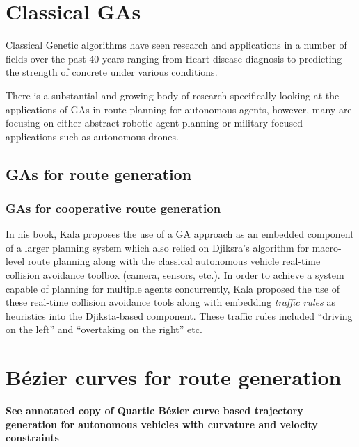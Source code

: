 
\section{Classical GAs}

Classical Genetic algorithms have seen research and applications in a number of fields over the past 40 years ranging from Heart disease diagnosis\cite{reddyHybridGeneticAlgorithm2020} to predicting the strength of concrete under various conditions\cite{shariatiPredictionConcreteStrength2020}.

There is a substantial and growing body of research specifically looking at the applications of GAs in route planning for autonomous agents, however, many are focusing on either abstract robotic agent planning or  military focused applications such as autonomous drones\cite{robergeFastGeneticAlgorithm2018}.


\subsection{GAs for route generation}


\subsubsection{GAs for cooperative route generation}

In his book, Kala \cite{kalaOptimizationBasedPlanning2016} proposes the use of a GA approach as an embedded component of a larger planning system which also relied on Djiksra's algorithm for macro-level route planning along with the classical autonomous vehicle real-time collision avoidance toolbox (camera, sensors, etc.). In order to achieve a system capable of planning for multiple agents concurrently, Kala proposed the use of these real-time collision avoidance tools along with embedding \textit{traffic rules} as heuristics into the Djiksta-based component. These traffic rules included ``driving on the left'' and ``overtaking on the right'' etc.


\section{Bézier curves for route generation}

\textbf{See annotated copy of Quartic Bézier curve based trajectory generation for autonomous vehicles with curvature and velocity constraints \cite{chenQuarticBezierCurve2014}}

